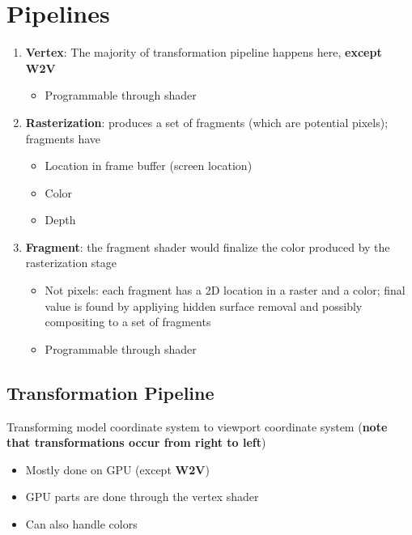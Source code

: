 \chapter{Pipelines}\label{chapter-pipelines}

\begin{enumerate}
  \item \textbf{Vertex}: The majority of transformation pipeline happens here,
  \textbf{except W2V}
  \begin{itemize}
    \item Programmable through shader
  \end{itemize}

  \item \textbf{Rasterization}: produces a set of fragments (which are
  potential pixels); fragments have
  \begin{itemize}
    \item Location in frame buffer (screen location)
    \item Color
    \item Depth
  \end{itemize}

  \item \textbf{Fragment}: the fragment shader would finalize the color
  produced by the rasterization stage
  \begin{itemize}
    \item Not pixels: each fragment has a 2D location in a raster and a color;
    final value is found by appliying hidden surface removal and possibly
    compositing to a set of fragments
    \item Programmable through shader
  \end{itemize}
\end{enumerate}

\section{Transformation Pipeline}

  Transforming model coordinate system to viewport coordinate system
  (\textbf{note that transformations occur from right to left})

  \begin{itemize}
    \item Mostly done on GPU (except \textbf{W2V})
    \item GPU parts are done through the vertex shader
    \item Can also handle colors
  \end{itemize}


